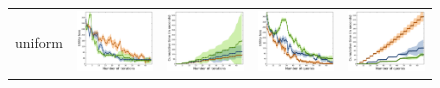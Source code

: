 \documentclass{article}
\renewcommand\[{\begin{equation}}
\renewcommand\]{\end{equation}}
\newcommand{\paolo}[1]{{\bf \textcolor{red}{{\fbox{Paolo:} #1}}}}
\begin{document}

\begin{figure}
    \centering
    {\footnotesize
    \begin{tabular}{lcccc}
        \\
        {\sc uniform} &
        \includegraphics[align=c,width=10em]{figures/pc_with_costs_uniform_sparse_per_iter_loss} &
        \includegraphics[align=c,width=10em]{figures/pc_with_costs_uniform_sparse_per_iter_time} &
        \includegraphics[align=c,width=10em]{figures/pc_with_costs_uniform_sparse_per_query_loss} &
        \includegraphics[align=c,width=10em]{figures/pc_with_costs_uniform_sparse_per_query_time}


\end{tabular}}
\end{figure}
\end{document}
